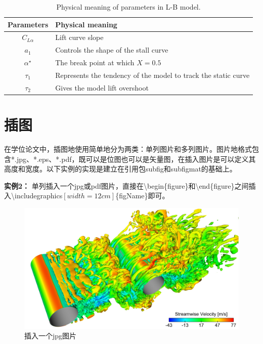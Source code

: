 \begin{table}                %
\centering
 \begin{center}
  \caption{Physical meaning of parameters in L-B model.}
  \label{tab:LB-parameters}
  \begin{tabular}{cl}
       \\\hline
       Parameters & Physical meaning       \\\hline
       $C_{L\alpha}$ & Lift curve slope \\
       $a_{1}$ & Controls the shape of the stall curve \\
       $\alpha^{\star}$ & The break point at which $X=0.5$ \\
       $\tau_{1}$ & Represents the tendency of the model to track the static curve \\
       $\tau_{2}$ & Gives the model lift overshoot \\\hline
  \end{tabular}
 \end{center}
\end{table}

\section{插图}
\label{sec:fig}

在学位论文中，插图地使用简单地分为两类：单列图片和多列图片。图片地格式包含*.jpg、*.eps、*.pdf，既可以是位图也可以是矢量图，在插入图片是可以定义其高度和宽度。以下实例的实现是建立在引用包subfig和subfigmat的基础上。

{\bf{实例2：}} 单列插入一个jpg或pdf图片，直接在\textbackslash begin\{figure\}和\textbackslash end\{figure\}之间插入\textbackslash includegraphics$\left[width=12cm\right]$\{figName\}即可。

\begin{figure}
\centering
   \includegraphics[width=12cm]{./img/visual_jpg}
  \caption{插入一个jpg图片}
  \label{fig:visual}
\end{figure}

